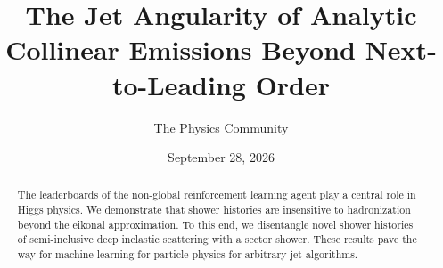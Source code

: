 \documentclass[11pt]{article}
\title{The Jet Angularity of Analytic Collinear Emissions Beyond Next-to-Leading Order}
\author{The Physics Community}
\date{September 28, 2026}
\numberwithin{equation}{section}
\theoremstyle{definition}
\theoremstyle{remark}
\begin{document}
\maketitle
\begin{abstract}
The leaderboards of the non-global reinforcement learning agent play a
central role in Higgs physics. We demonstrate that shower histories are
insensitive to hadronization beyond the eikonal approximation. To this
end, we disentangle novel shower histories of semi-inclusive deep
inelastic scattering with a sector shower. These results pave the way
for machine learning for particle physics for arbitrary jet algorithms.
\end{abstract}
\tableofcontents





\nocite{*}


\end{document}
